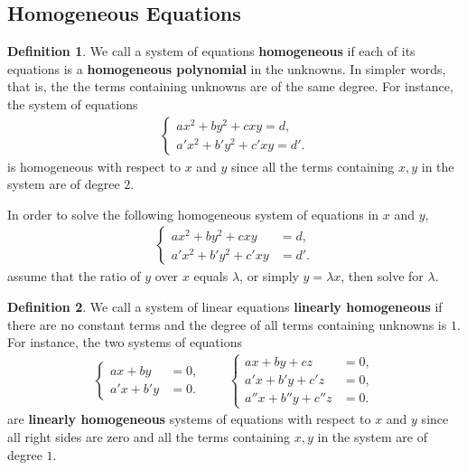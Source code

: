 \documentclass[12pt,a4paper]{memoir}
\theoremstyle{definition}
\newtheorem*{definition}{Definition}
\begin{document}
\subsection{Homogeneous Equations}


	\begin{definition}
		We call a system of equations \textbf{homogeneous} if each of its equations is a \textbf{homogeneous polynomial} in the unknowns. In simpler words, that is, the the terms containing unknowns are of the same degree. For instance, the system of equations
		\begin{align*}
			\begin{cases}
				ax^2+by^2+cxy=d,\\a'x^2+b'y^2+c'xy=d'.
			\end{cases}
		\end{align*}
		is homogeneous with respect to $x$ and $y$ since all the terms containing $x,y$ in the system are of degree $2$. 
	\end{definition}
	\begin{question}
		In order to solve the following homogeneous system of equations in $x$ and $y$,
		\begin{align*}
			\begin{cases}
				ax^2+by^2+cxy &= d,\\a'x^2+b'y^2+c'xy &=d'.
			\end{cases}
		\end{align*}
		assume that the ratio of $y$ over $x$ equals $\lambda$, or simply $y=\lambda x$, then solve for $\lambda$.
		\begin{definition}
			We call a system of linear equations \textbf{linearly homogeneous} if there are no constant terms and the degree of all terms containing unknowns is $1$. For instance, the two systems of equations
			\begin{align*}
				\begin{cases}
					ax+by &= 0,\\a'x+b'y &= 0.
				\end{cases} \qquad
				\begin{cases}
					ax+by+cz &= 0,\\a'x+b'y+c'z &= 0,\\ a''x+b''y+c''z &=0.
				\end{cases}
			\end{align*}
			are \textbf{linearly homogeneous} systems of equations with respect to $x$ and $y$ since all right sides are zero and all the terms containing $x,y$ in the system are of degree $1$.
		\end{definition}
	\end{question}
\end{document}
